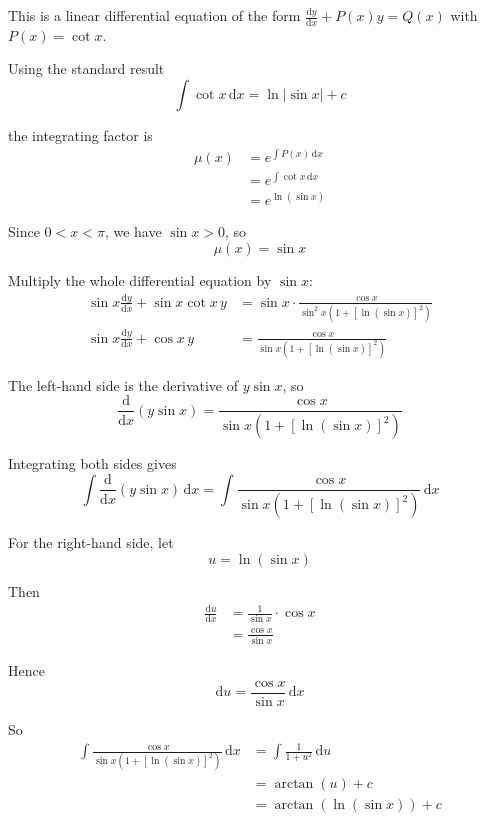 \documentclass[leqno]{article}
\begin{document}
\begin{enumerate}[
  label=\textbf{\arabic*.},
  leftmargin=*,
  topsep=0pt,
  partopsep=0pt,
  parsep=0pt
]
\vspace*{10pt}

\begin{djsSolution}
This is a linear differential equation of the form \(\frac{\mathrm{d}y}{\mathrm{d}x}+P(x)y=Q(x)\) with \(P(x)=\cot x\).

Using the standard result
\[
\int \cot x\,\mathrm{d}x=\ln|\sin x|+c
\]

the integrating factor is
\begin{align*}
\mu(x)
&=e^{\int P(x)\,\mathrm{d}x} \\
&=e^{\int \cot x\,\mathrm{d}x} \\
&=e^{\ln(\sin x)}
\end{align*}

Since $0<x<\pi$, we have $\sin x>0$, so
\[
\mu(x)=\sin x
\]

Multiply the whole differential equation by $\sin x$:
\begin{align*}
\sin x\frac{\mathrm{d}y}{\mathrm{d}x}+\sin x\cot x\,y
&=\sin x\cdot \frac{\cos x}{\sin^2 x\left(1+\left[\ln(\sin x)\right]^2\right)} \\
\sin x\frac{\mathrm{d}y}{\mathrm{d}x}+\cos x\,y
&=\frac{\cos x}{\sin x\left(1+\left[\ln(\sin x)\right]^2\right)}
\end{align*}

The left-hand side is the derivative of $y\sin x$, so
\[
\frac{\mathrm{d}}{\mathrm{d}x}(y\sin x)=\frac{\cos x}{\sin x\left(1+\left[\ln(\sin x)\right]^2\right)}
\]

Integrating both sides gives
\[
\int \frac{\mathrm{d}}{\mathrm{d}x}(y\sin x)\,\mathrm{d}x
=
\int \frac{\cos x}{\sin x\left(1+\left[\ln(\sin x)\right]^2\right)}\,\mathrm{d}x
\]

For the right-hand side, let
\[
u=\ln(\sin x)
\]

Then
\begin{align*}
\frac{\mathrm{d}u}{\mathrm{d}x}
&=\frac{1}{\sin x}\cdot \cos x \\
&=\frac{\cos x}{\sin x}
\end{align*}

Hence
\[
\mathrm{d}u=\frac{\cos x}{\sin x}\,\mathrm{d}x
\]

So
\begin{align*}
\int \frac{\cos x}{\sin x\left(1+\left[\ln(\sin x)\right]^2\right)}\,\mathrm{d}x
&=\int \frac{1}{1+u^2}\,\mathrm{d}u \\
&=\arctan(u)+c \\
&=\arctan(\ln(\sin x))+c
\end{align*}


\end{djsSolution}
\end{enumerate}
\end{document}
